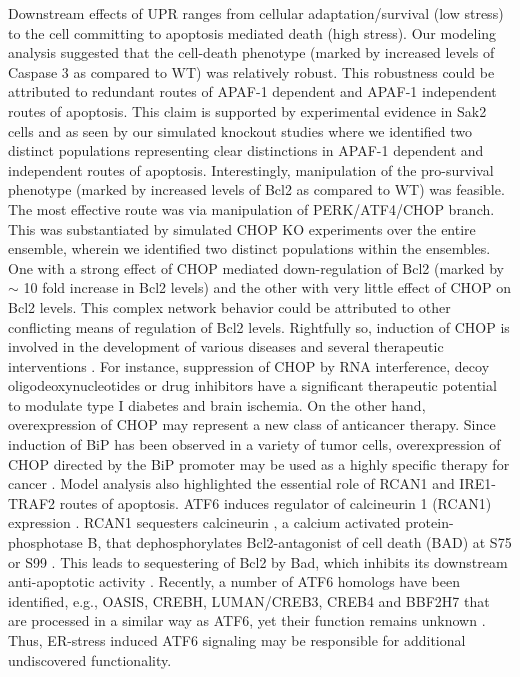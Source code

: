 \documentclass[12pt]{article}
\begin{document}
Downstream effects of UPR ranges from cellular adaptation/survival (low stress) to the cell committing to apoptosis mediated death (high stress). Our modeling analysis suggested that the cell-death phenotype (marked by increased levels of Caspase 3 as compared to WT) was relatively robust. This robustness could be attributed to redundant routes of APAF-1 dependent and APAF-1 independent routes of apoptosis. This claim is supported by experimental evidence in Sak2 cells \cite{rao2002cer} and as seen by our simulated knockout studies where we identified two distinct populations representing clear distinctions in APAF-1 dependent and independent routes of apoptosis. Interestingly, manipulation of the pro-survival phenotype (marked by increased levels of Bcl2 as compared to WT) was feasible. The most effective route was via manipulation of PERK/ATF4/CHOP branch. This was substantiated by simulated CHOP KO experiments over the entire ensemble, wherein we identified two distinct populations within the ensembles. One with a strong effect of CHOP mediated down-regulation of Bcl2 (marked by $\sim$ 10 fold increase in Bcl2 levels) and the other with very little effect of CHOP on Bcl2 levels. This complex network behavior could be attributed to other conflicting means of regulation of Bcl2 levels. Rightfully so, induction of CHOP is involved in the development of various diseases and several therapeutic interventions \cite{oyadomari2003rcg}. For instance, suppression of CHOP by RNA interference, decoy oligodeoxynucleotides or drug inhibitors have a significant therapeutic potential to modulate type I diabetes and brain ischemia. On the other hand, overexpression of CHOP may represent a new class of anticancer therapy. Since induction of BiP has been observed in a variety of tumor cells, overexpression of CHOP directed by the BiP promoter may be used as a highly specific therapy for cancer \cite{oyadomari2003rcg}. Model analysis also highlighted the essential role of RCAN1 and IRE1-TRAF2 routes of apoptosis. ATF6 induces regulator of calcineurin 1 (RCAN1) expression \cite{belmont2008cga}. RCAN1 sequesters calcineurin \cite{belmont2008cga}, a calcium activated protein-phosphotase B, that dephosphorylates Bcl2-antagonist of cell death (BAD) at S75 or S99 \cite{wang1999cia}. This leads to sequestering of Bcl2 by Bad, which inhibits its downstream anti-apoptotic activity \cite{wang1999cia}. Recently, a number of ATF6 homologs have been identified, e.g., OASIS, CREBH, LUMAN/CREB3, CREB4 and BBF2H7 that are processed in a similar way as ATF6, yet their function remains unknown \cite{Ron:2007rq}. Thus, ER-stress induced ATF6 signaling may be responsible for additional undiscovered functionality. 
\end{document}

